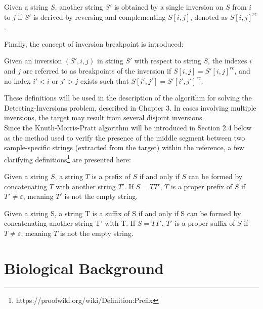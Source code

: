 \begin{definition}
Given a string $S$, another string $S'$ is obtained by a single inversion on $S$ from $i$ to $j$ if $S'$ is derived by reversing and complementing $S[i,j]$, denoted as $S[i,j]^{rc}$.
\end{definition}

Finally, the concept of inversion breakpoint is introduced:

\begin{definition}
Given an inversion $(S', i, j)$ in string $S'$ with respect to string $S$, the indexes $i$ and $j$ are referred to as breakpoints of the inversion if $S[i,j] = S'[i,j]^{rc}$, and no index $i' < i$ or $j' > j$ exists such that $S[i',j'] = S'[i',j']^{rc}$.
\end{definition}

These definitions will be used in the description of the algorithm for solving the Detecting-Inversions problem, described in Chapter 3. In cases involving multiple inversions, the target may result from several disjoint inversions.\\

Since the Knuth-Morris-Pratt algorithm will be introduced in Section 2.4 below as the method used to verify the presence of the middle segment between two sample-specific strings (extracted from the target) within the reference, a few clarifying definitions\footnote{https://proofwiki.org/wiki/Definition:Prefix} are presented here:

\begin{definition}
Given a string $S$, a string $T$ is a prefix of $S$ if and only if $S$ can be formed by concatenating $T$ with another string $T'$. If $S = TT'$, $T$ is a proper prefix of $S$ if $T' \neq \varepsilon$, meaning $T'$ is not the empty string.

\label{thm:proprefix}
\end{definition}

\begin{definition}
Given a string S, a string T is a suffix of S if and only if S can be formed by concatenating another string T' with T. If $S = TT'$, $T'$ is a proper suffix of $S$ if $T \neq \varepsilon$, meaning $T$ is not the empty string.
\label{thm:prosuffix}
\end{definition}

\section{Biological Background}

